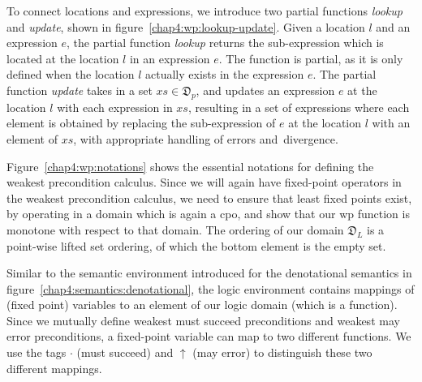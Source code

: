 To connect locations and expressions, we introduce two partial functions \textit{lookup} and \textit{update}, shown in figure~\ref{chap4:wp:lookup-update}. Given a location $l$
and an expression $e$, the partial function \textit{lookup} returns the sub-expression which is
located at the location $l$ in an expression $e$. The function is partial, as it is only defined
when the location $l$ actually exists in the expression $e$. The partial function \textit{update}
takes in a set $\mathit{xs} \in\mathfrak{D}_p$, and updates an expression $e$ at the
location $l$ with each expression in $\mathit{xs}$, resulting in a set of
expressions where each element is obtained by replacing the sub-expression of $e$ at the location
$l$ with an element of $\mathit{xs}$, with appropriate handling of errors and~divergence.

Figure~\ref{chap4:wp:notations} shows the essential notations for defining the weakest precondition calculus. Since we will again have fixed-point operators in the weakest precondition calculus, we need to ensure that least fixed points exist, by operating in a domain which is again a cpo, and show that our wp function is monotone with respect to that domain. The ordering of our domain $\mathfrak{D}_L$ is a point-wise lifted set ordering, of which the bottom element is the empty set.

Similar to the semantic environment introduced for the denotational semantics in figure~\ref{chap4:semantics:denotational}, the logic environment contains mappings of (fixed point) variables to an element of our logic domain (which is a function). Since we mutually define weakest must succeed preconditions and weakest may error preconditions, a fixed-point variable can map to two different functions. We use the tags $\cdot$ (must succeed) and $\uparrow$ (may error) to distinguish these two different mappings.

